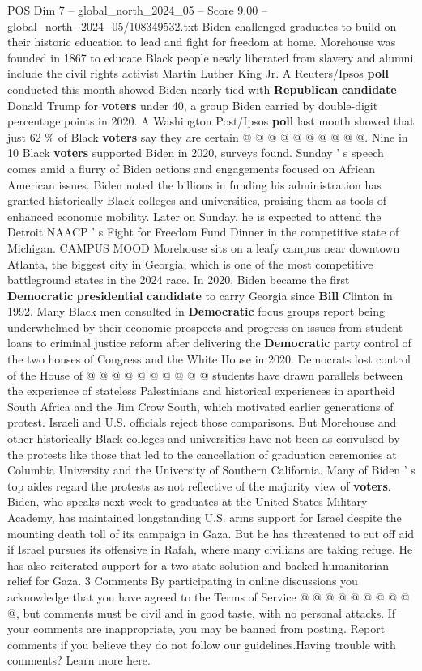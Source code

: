 \begin{textsample}{POS Dim 7 – global\_north\_2024\_05 – Score 9.00 – global\_north\_2024\_05/108349532.txt}
Biden challenged graduates to build on their historic education to lead and fight for freedom at home.
Morehouse was founded in 1867 to educate Black people newly liberated from slavery and alumni include the civil rights activist Martin Luther King Jr.
A Reuters/Ipsos \textbf{poll} conducted this month showed Biden nearly tied with \textbf{Republican} \textbf{candidate} Donald Trump for \textbf{voters} under 40, a group Biden carried by double-digit percentage points in 2020.
A Washington Post/Ipsos \textbf{poll} last month showed that just 62 \% of Black \textbf{voters} say they are certain @ @ @ @ @ @ @ @ @ @.
Nine in 10 Black \textbf{voters} supported Biden in 2020, surveys found.
Sunday ' s speech comes amid a flurry of Biden actions and engagements focused on African American issues.
Biden noted the billions in funding his administration has granted historically Black colleges and universities, praising them as tools of enhanced economic mobility.
Later on Sunday, he is expected to attend the Detroit NAACP ' s Fight for Freedom Fund Dinner in the competitive state of Michigan.
CAMPUS MOOD Morehouse sits on a leafy campus near downtown Atlanta, the biggest city in Georgia, which is one of the most competitive battleground states in the 2024 race.
In 2020, Biden became the first \textbf{Democratic} \textbf{presidential} \textbf{candidate} to carry Georgia since \textbf{Bill} Clinton in 1992.
Many Black men consulted in \textbf{Democratic} focus groups report being underwhelmed by their economic prospects and progress on issues from student loans to criminal justice reform after delivering the \textbf{Democratic} party control of the two houses of Congress and the White House in 2020.
Democrats lost control of the House of @ @ @ @ @ @ @ @ @ @ students have drawn parallels between the experience of stateless Palestinians and historical experiences in apartheid South Africa and the Jim Crow South, which motivated earlier generations of protest.
Israeli and U.S. officials reject those comparisons.
But Morehouse and other historically Black colleges and universities have not been as convulsed by the protests like those that led to the cancellation of graduation ceremonies at Columbia University and the University of Southern California.
Many of Biden ' s top aides regard the protests as not reflective of the majority view of \textbf{voters}.
Biden, who speaks next week to graduates at the United States Military Academy, has maintained longstanding U.S. arms support for Israel despite the mounting death toll of its campaign in Gaza.
But he has threatened to cut off aid if Israel pursues its offensive in Rafah, where many civilians are taking refuge.
He has also reiterated support for a two-state solution and backed humanitarian relief for Gaza. 3 Comments By participating in online discussions you acknowledge that you have agreed to the Terms of Service @ @ @ @ @ @ @ @ @ @, but comments must be civil and in good taste, with no personal attacks.
If your comments are inappropriate, you may be banned from posting.
Report comments if you believe they do not follow our guidelines.Having trouble with comments?
Learn more here.


\end{textsample}
